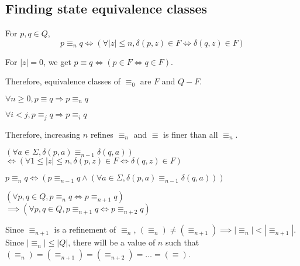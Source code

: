 \subsection{Finding state equivalence classes}

\begin{definition} For $p, q \in Q$,
\[ p \equiv_n q \iff (\forall |z| \le n, \delta(p, z) \in F \iff \delta(q, z) \in F) \]
\end{definition}
\begin{theorem}For $|z| = 0$, we get $p \equiv q \iff (p \in F \iff q \in F)$.\end{theorem}
Therefore, equivalence classes of $\equiv_0$ are $F$ and $Q-F$.
\begin{theorem}$\forall n \ge 0, p \equiv q \Rightarrow p \equiv_n q$\end{theorem}
\begin{theorem}$\forall i < j, p \equiv_j q \Rightarrow p \equiv_i q$\end{theorem}
Therefore, increasing $n$ refines $\equiv_n$ and $\equiv$ is finer than all $\equiv_n$.
\begin{theorem}$(\forall a \in \Sigma, \delta(p, a) \equiv_{n-1} \delta(q, a))$\\
$\iff (\forall 1 \le |z| \le n, \delta(p, z) \in F \iff \delta(q, z) \in F)$\end{theorem}
\begin{theorem}$p \equiv_n q \iff (p \equiv_{n-1} q \wedge
(\forall a \in \Sigma, \delta(p, a) \equiv_{n-1} \delta(q, a)))$ \end{theorem}
\begin{theorem}$(\forall p, q \in Q, p \equiv_n q \iff p \equiv_{n+1} q)$\\
$\implies (\forall p, q \in Q, p \equiv_{n+1} q \iff p \equiv_{n+2} q)$\end{theorem}

Since $\equiv_{n+1}$ is a refinement of $\equiv_n$,
$(\equiv_n) \neq (\equiv_{n+1}) \implies |\equiv_n| < |\equiv_{n+1}|$.
Since $|\equiv_n| \le |Q|$, there will be a value of $n$ such that
$(\equiv_n) = (\equiv_{n+1}) = (\equiv_{n+2}) = \ldots = (\equiv)$.


